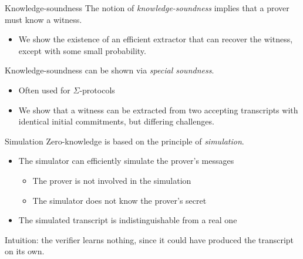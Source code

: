 \begin{frame}{Knowledge-soundness}
  The notion of \emph{knowledge-soundness} implies that a prover must know a witness.
  \begin{itemize}[<+(1)->]
    \item We show the existence of an efficient extractor that can recover the witness, except with some small probability.
  \end{itemize}

  \vspace*{1em}

  \pause
  Knowledge-soundness can be shown via \emph{special soundness}.
  \begin{itemize}[<+(1)->]
    \item Often used for $\Sigma$-protocols
    \item We show that a witness can be extracted from two accepting transcripts with identical initial commitments, but differing challenges.
  \end{itemize}
\end{frame}

\begin{frame}{Simulation}
  Zero-knowledge is based on the principle of \emph{simulation}.
  \begin{itemize}[<+(1)->]
    \item The simulator can efficiently simulate the prover's messages
    \begin{itemize}
      \item The prover is not involved in the simulation
      \item The simulator does not know the prover's secret
    \end{itemize}
    \item The simulated transcript is indistinguishable from a real one
  \end{itemize}

  \vspace*{1em}

  \pause
  Intuition: the verifier learns nothing, since it could have produced the transcript on its own.
\end{frame}

